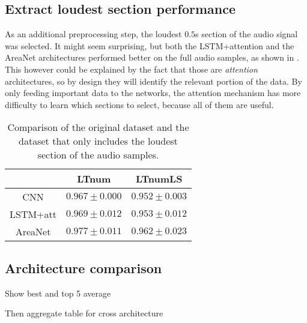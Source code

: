 
\subsection{Extract loudest section performance}

As an additional preprocessing step, the loudest $0.5$s section of the audio
signal was selected.
It might seem surprising, but both the LSTM+attention and the AreaNet
architectures performed better on the full audio samples, 
as shown in .
This however could be explained by the fact that those are \textit{attention}
architectures, so by design they will identify the relevant portion of the data.
By only feeding important data to the networks, the attention mechanism has more
difficulty to learn which sections to select, because all of them are useful.


\begin{table}[t!]
    \centering
    \caption{Comparison of the original dataset and the dataset that only
    includes the loudest section of the audio samples.}
    \label{tab:comparison_loud_section}
    \begin{tabular}{|c|c|c|}
        \hline
        & LTnum & LTnumLS \\
        \hline
        CNN      & $0.967 \pm 0.000$ & $0.952 \pm 0.003$ \\
        LSTM+att & $0.969 \pm 0.012$ & $0.953 \pm 0.012$ \\
        AreaNet  & $0.977 \pm 0.011$ & $0.962 \pm 0.023$ \\
        \hline
    \end{tabular}
\end{table}

\subsection{Architecture comparison}

Show best and top 5 average

Then aggregate table for cross architecture

